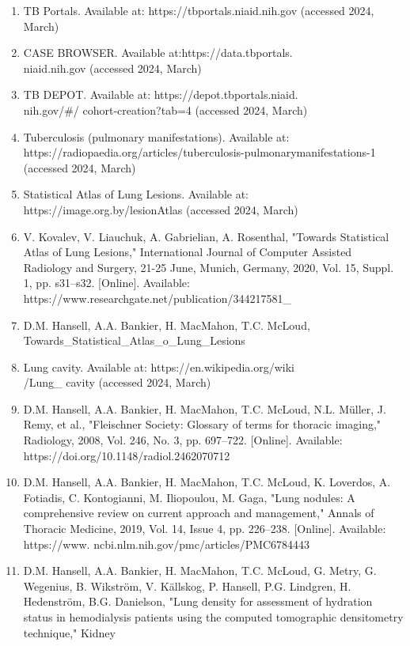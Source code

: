 \documentclass[a4paper]{article}
\begin{document}
\begin{multicols}{2}
\begin{enumerate}
    \item TB Portals. Available at: https://tbportals.niaid.nih.gov (accessed
2024, March)
    \item CASE BROWSER. Available at:https://data.tbportals.\\niaid.nih.gov (accessed 2024, March)
    \item TB DEPOT. Available at: https://depot.tbportals.niaid.\\nih.gov/#/
cohort-creation?tab=4 (accessed 2024, March)
    \item Tuberculosis (pulmonary manifestations). Available at:
https://radiopaedia.org/articles/tuberculosis-pulmonarymanifestations-1 (accessed 2024, March)
    \item Statistical Atlas of Lung Lesions. Available at:
https://image.org.by/lesionAtlas (accessed 2024, March)
    \item V. Kovalev, V. Liauchuk, A. Gabrielian, A. Rosenthal, "Towards
Statistical Atlas of Lung Lesions," International Journal of
Computer Assisted Radiology and Surgery, 21-25 June, Munich, Germany, 2020, Vol. 15, Suppl. 1, pp. s31–s32. [Online].
Available: https://www.researchgate.net/publication/344217581\_
\item D.M. Hansell, A.A. Bankier, H. MacMahon, T.C. McLoud,
Towards\_Statistical\_Atlas\_o\_Lung\_Lesions
    \item Lung cavity. Available at: https://en.wikipedia.org/wiki\\/Lung\_
cavity (accessed 2024, March)
    \item D.M. Hansell, A.A. Bankier, H. MacMahon, T.C. McLoud,
N.L. Müller, J. Remy, et al., "Fleischner Society:
Glossary of terms for thoracic imaging," Radiology,
2008, Vol. 246, No. 3, pp. 697–722. [Online]. Available:
https://doi.org/10.1148/radiol.2462070712
    \item D.M. Hansell, A.A. Bankier, H. MacMahon, T.C. McLoud, K. Loverdos, A. Fotiadis, C. Kontogianni, M. Iliopoulou,
M. Gaga, "Lung nodules: A comprehensive review on current
approach and management," Annals of Thoracic Medicine, 2019,
Vol. 14, Issue 4, pp. 226–238. [Online]. Available: https://www.
ncbi.nlm.nih.gov/pmc/articles/PMC6784443
    \item D.M. Hansell, A.A. Bankier, H. MacMahon, T.C. McLoud, G. Metry, G. Wegenius, B. Wikström, V. Källskog, P. Hansell,
P.G. Lindgren, H. Hedenström, B.G. Danielson, "Lung density
for assessment of hydration status in hemodialysis patients using the computed tomographic densitometry technique," Kidney

\end{enumerate}
\end{multicols}
\end{document}

